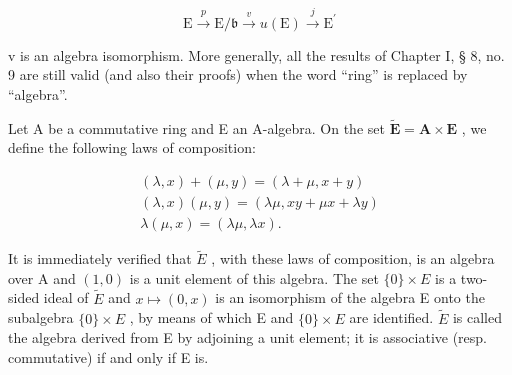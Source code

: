 \[
\mathrm{E} \xrightarrow {p} \mathrm{E} / \mathfrak {b} \xrightarrow {v} u (\mathrm{E}) \xrightarrow {j} \mathrm{E} ^ {\prime}
\]

v is an algebra isomorphism. More generally, all the results of Chapter I, § 8, no. 9 are still valid (and also their proofs) when the word ``ring'' is replaced by ``algebra''.

Let A be a commutative ring and E an A-algebra. On the set \(\tilde{\mathbf{E}} = \mathbf{A} \times \mathbf{E}\) , we define the following laws of composition:

\[
\begin{array}{r} (\lambda , x) + (\mu , y) = (\lambda + \mu , x + y) \\ (\lambda , x) (\mu , y) = (\lambda \mu , x y + \mu x + \lambda y) \\ \lambda (\mu , x) = (\lambda \mu , \lambda x). \end{array}
\]

It is immediately verified that \(\tilde{E}\) , with these laws of composition, is an algebra over A and \((1,0)\) is a unit element of this algebra. The set \(\{0\}\times E\) is a two-sided ideal of \(\tilde{E}\) and \(x\mapsto(0,x)\) is an isomorphism of the algebra E onto the subalgebra \(\{0\}\times E\) , by means of which E and \(\{0\}\times E\) are identified. \(\tilde{E}\) is called the algebra derived from E by adjoining a unit element; it is associative (resp. commutative) if and only if E is.

